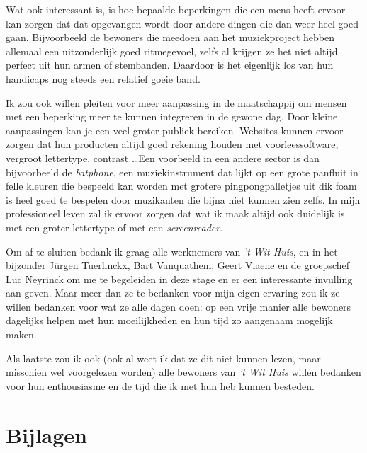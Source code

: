 \documentclass[a4paper,12pt]{article}
\begin{document}
Wat ook interessant is, is hoe bepaalde beperkingen die een mens heeft ervoor kan zorgen dat dat opgevangen wordt door andere dingen die dan weer heel goed gaan. Bijvoorbeeld de bewoners die meedoen aan het muziekproject hebben allemaal een uitzonderlijk goed ritmegevoel, zelfs al krijgen ze het niet altijd perfect uit hun armen of stembanden. Daardoor is het eigenlijk los van hun handicaps nog steeds een relatief goeie band.

Ik zou ook willen pleiten voor meer aanpassing in de maatschappij om mensen met een beperking meer te kunnen integreren in de gewone dag. Door kleine aanpassingen kan je een veel groter publiek bereiken. Websites kunnen ervoor zorgen dat hun producten altijd goed rekening houden met voorleessoftware, vergroot lettertype, contrast \dots Een voorbeeld in een andere sector is dan bijvoorbeeld de \emph{batphone}, een muziekinstrument dat lijkt op een grote panfluit in felle kleuren die bespeeld kan worden met grotere pingpongpalletjes uit dik foam is heel goed te bespelen door muzikanten die bijna niet kunnen zien zelfs. In mijn professioneel leven zal ik ervoor zorgen dat wat ik maak altijd ook duidelijk is met een groter lettertype of met een \emph{screenreader}.

Om af te sluiten bedank ik graag alle werknemers van \emph{'t Wit Huis}, en in het bijzonder Jürgen Tuerlinckx, Bart Vanquathem, Geert Viaene en de groepschef Luc Neyrinck om me te begeleiden in deze stage en er een interessante invulling aan geven. Maar meer dan ze te bedanken voor mijn eigen ervaring zou ik ze willen bedanken voor wat ze alle dagen doen: op een vrije manier alle bewoners dagelijks helpen met hun moeilijkheden en hun tijd zo aangenaam mogelijk maken.

Als laatste zou ik ook (ook al weet ik dat ze dit niet kunnen lezen, maar misschien wel voorgelezen worden) alle bewoners van \emph{'t Wit Huis} willen bedanken voor hun enthousiasme en de tijd die ik met hun heb kunnen besteden.

\newpage

\section{Bijlagen}
\end{document}

